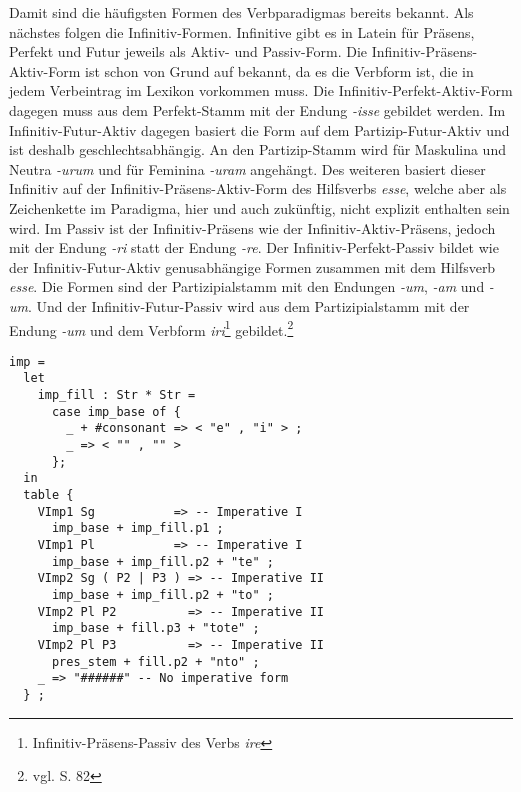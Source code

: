 Damit sind die häufigsten Formen des Verbparadigmas bereits bekannt. Als nächstes folgen die Infinitiv-Formen. Infinitive gibt es in Latein für Präsens, Perfekt und Futur jeweils als Aktiv- und Passiv-Form. Die Infinitiv-Präsens-Aktiv-Form ist schon von Grund auf bekannt, da es die Verbform ist, die in jedem Verbeintrag im Lexikon vorkommen muss. Die Infinitiv-Perfekt-Aktiv-Form dagegen muss aus dem Perfekt-Stamm mit der Endung \textit{-isse} gebildet werden. Im Infinitiv-Futur-Aktiv dagegen basiert die Form auf dem Partizip-Futur-Aktiv und ist deshalb geschlechtsabhängig. An den Partizip-Stamm wird für Maskulina und Neutra \textit{-urum} und für Feminina \textit{-uram} angehängt. Des weiteren basiert dieser Infinitiv auf der Infinitiv-Präsens-Aktiv-Form des Hilfsverbs \textit{esse}, welche aber als Zeichenkette im Paradigma, hier und auch zukünftig, nicht explizit enthalten sein wird. Im Passiv ist der Infinitiv-Präsens wie der Infinitiv-Aktiv-Präsens, jedoch mit der Endung \textit{-ri} statt der Endung \textit{-re}. Der Infinitiv-Perfekt-Passiv bildet wie der Infinitiv-Futur-Aktiv genusabhängige Formen zusammen mit dem Hilfsverb \textit{esse}. Die Formen sind der Partizipialstamm mit den Endungen \textit{-um}, \textit{-am} und \textit{-um}. Und der Infinitiv-Futur-Passiv wird aus dem Partizipialstamm mit der Endung \textit{-um} und dem Verbform \textit{iri}\footnote{Infinitiv-Präsens-Passiv des Verbs \textit{ire}} gebildet.\footnote{vgl. \cite{BAYER-LINDAUER1994} S. 82} \par
\begin{lstlisting}[float=h!tp,caption={Ausschnitt aus der Funktion \texttt{mkVerb} um Infinitiv-Verbformen zu bilden (vgl. \textbf{ResLat.gf})},label={GF-Res-MkVerb-Imp},basicstyle=\small]
imp = 
  let 
    imp_fill : Str * Str =
      case imp_base of {
        _ + #consonant => < "e" , "i" > ;
        _ => < "" , "" >
      };
  in
  table {
    VImp1 Sg           => -- Imperative I
      imp_base + imp_fill.p1 ;
    VImp1 Pl           => -- Imperative I
      imp_base + imp_fill.p2 + "te" ;
    VImp2 Sg ( P2 | P3 ) => -- Imperative II
      imp_base + imp_fill.p2 + "to" ;
    VImp2 Pl P2          => -- Imperative II
      imp_base + fill.p3 + "tote" ;
    VImp2 Pl P3          => -- Imperative II 
      pres_stem + fill.p2 + "nto" ;
    _ => "######" -- No imperative form
  } ;
\end{lstlisting}

